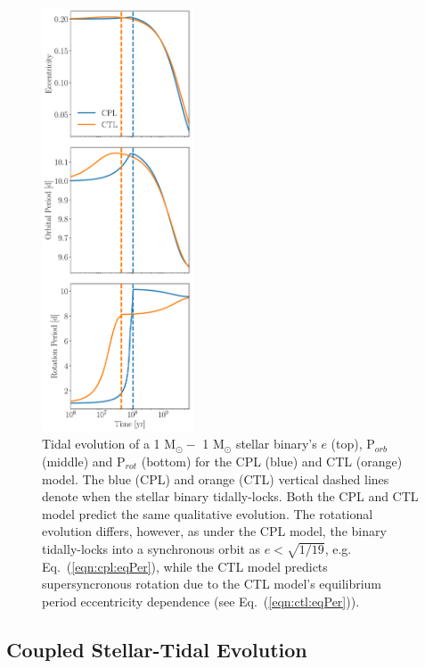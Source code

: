 \documentclass[twocolumn]{aastex61}
\begin{document}
\begin{figure}[h]
	\includegraphics[width=0.4\textwidth]{../Plots/tidalExample.pdf}
   \caption{Tidal evolution of a 1 M$_{\odot} -$ 1 M$_{\odot}$ stellar binary's $e$ (top), P$_{orb}$ (middle) and P$_{rot}$ (bottom) for the CPL (blue) and CTL (orange) model. The blue (CPL) and orange (CTL) vertical dashed lines denote when the stellar binary tidally-locks. Both the CPL and CTL model predict the same qualitative evolution. The rotational evolution differs, however, as under the CPL model, the binary tidally-locks into a synchronous orbit as $e < \sqrt{1/19}$, e.g. Eq.~(\ref{eqn:cpl:eqPer}), while the CTL model predicts supersyncronous rotation due to the CTL model's equilibrium period eccentricity dependence (see Eq.~(\ref{eqn:ctl:eqPer})).}%
    \label{fig:tidalExample}%
\end{figure}

\subsection{Coupled Stellar-Tidal Evolution} \label{sec:coupled}
\end{document}
